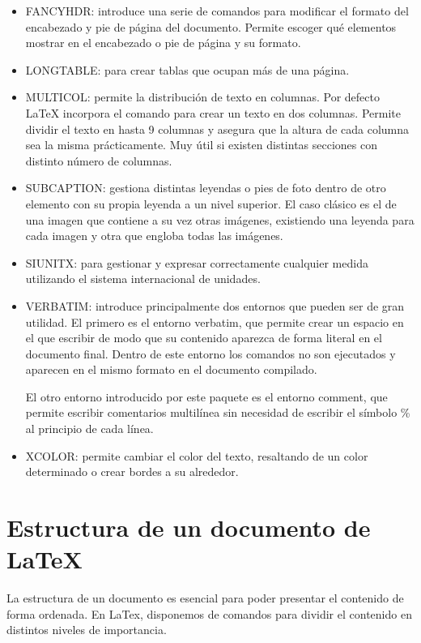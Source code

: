 \documentclass[11pt, a4paper]{article}
\begin{document}
\begin{itemize}
\item FANCYHDR: introduce una serie de comandos para modificar el formato del encabezado y pie de página del documento. Permite escoger qué elementos mostrar en el encabezado o pie de página y su formato.

\item LONGTABLE: para crear tablas que ocupan más de una página.

\item MULTICOL: permite la distribución de texto en columnas. Por defecto LaTeX incorpora el comando  para crear un texto en dos columnas. Permite dividir el texto en hasta 9 columnas y asegura que la altura de cada columna sea la misma prácticamente. Muy útil si existen distintas secciones con distinto número de columnas.

\item SUBCAPTION: gestiona distintas leyendas o pies de foto dentro de otro elemento con su propia leyenda a un nivel superior. El caso clásico es el de una imagen que contiene a su vez otras imágenes, existiendo una leyenda para cada imagen y otra que engloba todas las imágenes.

\item SIUNITX: para gestionar y expresar correctamente cualquier medida utilizando el sistema internacional de unidades. 

\item VERBATIM: introduce principalmente dos entornos que pueden ser de gran utilidad.
El primero es el entorno verbatim, que permite crear un espacio en el que escribir de modo que su contenido aparezca de forma literal en el documento final. Dentro de este entorno los comandos no son ejecutados y aparecen en el mismo formato en el documento compilado.

El otro entorno introducido por este paquete es el entorno comment, que permite escribir comentarios multilínea sin necesidad de escribir el símbolo \% al principio de cada línea.

\item XCOLOR: permite cambiar el color del texto, resaltando de un color determinado o crear bordes a su alrededor.
\end{itemize}
\section{Estructura de un documento de LaTeX}

La estructura de un documento es esencial para poder presentar el contenido de forma ordenada. En LaTex, disponemos de comandos para dividir el contenido en distintos niveles de importancia.
\end{document}
